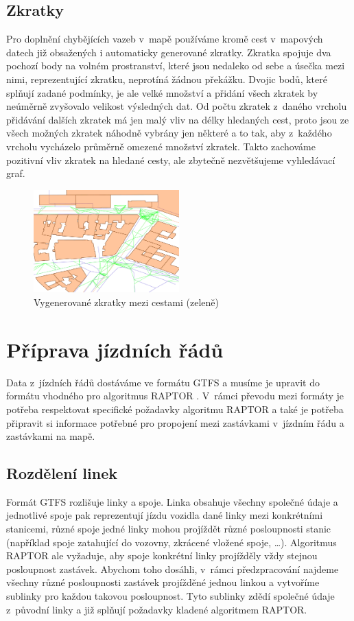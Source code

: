 \subsection{Zkratky}
Pro doplnění chybějících vazeb v~mapě používáme kromě cest v~mapových datech
již obsažených i automaticky generované zkratky. Zkratka spojuje dva pochozí
body na volném prostranství, které jsou nedaleko od sebe a úsečka mezi nimi,
reprezentující zkratku, neprotíná žádnou překážku. Dvojic bodů, které splňují
zadané podmínky, je ale velké množství a přidání všech zkratek by neúměrně
zvyšovalo velikost výsledných dat. Od počtu zkratek z~daného vrcholu přidávání
dalších zkratek má jen malý vliv na délky hledaných cest, proto jsou ze všech
možných zkratek náhodně vybrány jen některé a to tak, aby z~každého vrcholu
vycházelo průměrně omezené množství zkratek. Takto zachováme pozitivní vliv
zkratek na hledané cesty, ale zbytečně nezvětšujeme vyhledávací graf.
\begin{figure}
  \centering
    \includegraphics[width=0.5\textwidth]{../img/zkratky.pdf}
  \caption{Vygenerované zkratky mezi cestami (zeleně)}
  \label{fig:zkratky}
\end{figure}

\section{Příprava jízdních řádů}
Data z~jízdních řádů dostáváme ve formátu GTFS \cite{GTFS} a musíme je
upravit do formátu vhodného pro algoritmus RAPTOR \cite{RAPTOR}. V~rámci převodu
mezi formáty je potřeba respektovat specifické požadavky algoritmu RAPTOR a také
je potřeba připravit si informace potřebné pro propojení mezi zastávkami
v~jízdním řádu a zastávkami na mapě.

\subsection{Rozdělení linek}
Formát GTFS rozlišuje linky a spoje. Linka obsahuje všechny společné údaje a
jednotlivé spoje pak reprezentují jízdu vozidla dané linky mezi konkrétními
stanicemi, různé spoje jedné linky mohou projíždět různé posloupnosti stanic
(například spoje zatahující do vozovny, zkrácené vložené spoje, \dots).
Algoritmus RAPTOR ale vyžaduje, aby spoje konkrétní linky projížděly vždy
stejnou posloupnost zastávek. Abychom toho dosáhli, v~rámci předzpracování
najdeme všechny různé posloupnosti zastávek projížděné jednou linkou a vytvoříme
sublinky pro každou takovou posloupnost. Tyto sublinky zdědí společné údaje
z~původní linky a již splňují požadavky kladené algoritmem RAPTOR. 

